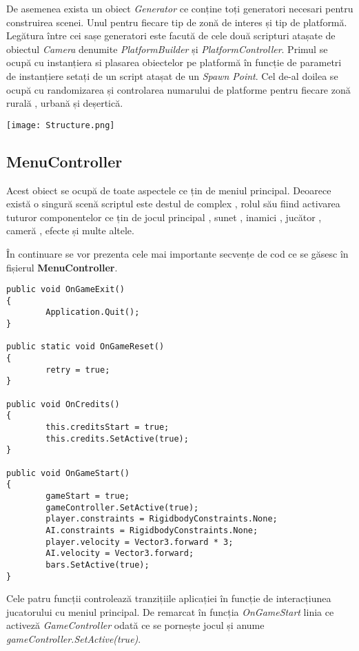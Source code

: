 De asemenea exista un obiect \textit{Generator} ce conține toți generatori necesari pentru construirea scenei. Unul pentru fiecare tip de zonă de interes și tip de platformă. Legătura între cei sașe generatori este facută de cele două scripturi atașate de obiectul \textit{Camera} denumite \textit{PlatformBuilder} și \textit{PlatformController}. Primul se ocupă cu instanțiera si plasarea obiectelor pe platformă în funcție de parametri de instanțiere setați de un script atașat de un \textit{Spawn Point}. Cel de-al doilea se ocupă cu randomizarea și controlarea numarului de platforme pentru fiecare zonă rurală , urbană și deșertică.\par

\texttt{[image: Structure.png]} \par

\subsection{MenuController}

Acest obiect se ocupă de toate aspectele ce țin de meniul principal. Deoarece există o singură scenă scriptul este destul de complex , rolul său fiind activarea tuturor componentelor ce țin de jocul principal , sunet , inamici , jucător , cameră , efecte și multe altele.\par

În continuare se vor prezenta cele mai importante secvențe de cod ce se găsesc în fișierul \textbf{MenuController}.\par

\begin{lstlisting}[caption=Caption example.,
  label=a_label]
public void OnGameExit()
{
        Application.Quit();
}

public static void OnGameReset()
{
        retry = true;
}

public void OnCredits()
{
        this.creditsStart = true;
        this.credits.SetActive(true);
}

public void OnGameStart()
{
        gameStart = true;
        gameController.SetActive(true);
        player.constraints = RigidbodyConstraints.None;
        AI.constraints = RigidbodyConstraints.None;
        player.velocity = Vector3.forward * 3;
        AI.velocity = Vector3.forward;
        bars.SetActive(true);
}
\end{lstlisting}

Cele patru funcții controlează tranzițiile aplicației în funcție de interacțiunea jucatorului cu meniul principal. De remarcat în funcția \textit{OnGameStart} linia ce activeză \textit{GameController} odată ce se pornește jocul și anume \textit{gameController.SetActive(true)}.\par

